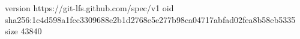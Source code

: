 version https://git-lfs.github.com/spec/v1
oid sha256:1c4d598a1fcc3309688e2b1d2768e5e277b98ca04717abfad02fea8b58eb5335
size 43840
